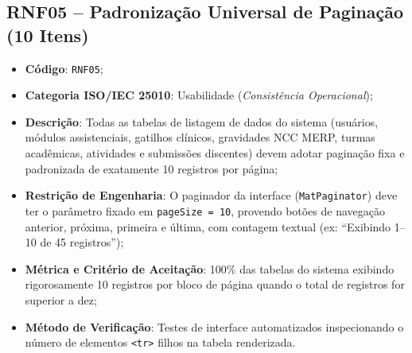 \subsection{RNF05 -- Padronização Universal de Paginação (10 Itens)}
\begin{itemize}
    \item \textbf{Código}: \texttt{RNF05};
    \item \textbf{Categoria ISO/IEC 25010}: Usabilidade (\textit{Consistência Operacional});
    \item \textbf{Descrição}: Todas as tabelas de listagem de dados do sistema (usuários, módulos assistenciais, gatilhos clínicos, gravidades NCC MERP, turmas acadêmicas, atividades e submissões discentes) devem adotar paginação fixa e padronizada de exatamente 10 registros por página;
    \item \textbf{Restrição de Engenharia}: O paginador da interface (\texttt{MatPaginator}) deve ter o parâmetro fixado em \texttt{pageSize = 10}, provendo botões de navegação anterior, próxima, primeira e última, com contagem textual (ex: ``Exibindo 1--10 de 45 registros'');
    \item \textbf{Métrica e Critério de Aceitação}: 100\% das tabelas do sistema exibindo rigorosamente 10 registros por bloco de página quando o total de registros for superior a dez;
    \item \textbf{Método de Verificação}: Testes de interface automatizados inspecionando o número de elementos \texttt{<tr>} filhos na tabela renderizada.
\end{itemize}

